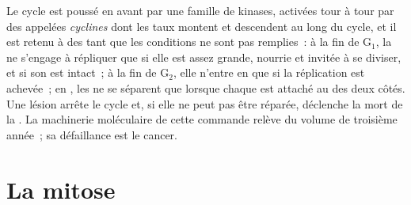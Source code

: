 \begin{proposition}\label{prop:b1:replication-mitosis:checkpoints}
Le cycle est poussé en avant par une famille de  kinases,
activées tour à tour par des  appelées \emph{cyclines} dont les
taux montent et descendent au long du cycle, et il est retenu à des
\emph{} tant que les conditions ne sont pas remplies~:
à la fin de G$_1$, la  ne s'engage à répliquer que si elle est
assez grande, nourrie et invitée à se diviser, et si son  est intact~;
à la fin de G$_2$, elle n'entre en  que si la réplication est
achevée~; en , les  ne se séparent que lorsque chaque
 est attaché au  des deux côtés. Une lésion arrête le
cycle et, si elle ne peut pas être réparée, déclenche la mort de la
. La machinerie moléculaire de cette commande relève du volume de
troisième année~; sa défaillance est le cancer.
\end{proposition}

\section{La mitose}

